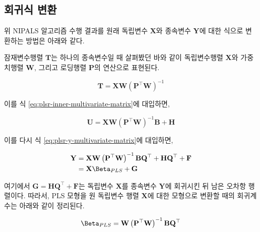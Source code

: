 \documentclass[]{book}
\newenvironment{Shaded}{\begin{snugshade}}{\end{snugshade}}
\newcommand{\KeywordTok}[1]{\textcolor[rgb]{0.13,0.29,0.53}{\textbf{#1}}}
\newcommand{\NormalTok}[1]{#1}
\newcommand{\OperatorTok}[1]{\textcolor[rgb]{0.81,0.36,0.00}{\textbf{#1}}}
\newcommand{\StringTok}[1]{\textcolor[rgb]{0.31,0.60,0.02}{#1}}
\begin{document}
\hypertarget{plsr-multivariate-transform}{%
\subsection{회귀식 변환}\label{plsr-multivariate-transform}}

위 NIPALS 알고리즘 수행 결과를 원래 독립변수 \(\mathbf{X}\)와 종속변수 \(\mathbf{Y}\)에 대한 식으로 변환하는 방법은 아래와 같다.

잠재변수행렬 \(\mathbf{T}\)는 하나의 종속변수일 때 살펴봤던 바와 같이 독립변수행렬 \(\mathbf{X}\)와 가중치행렬 \(\mathbf{W}\), 그리고 로딩행렬 \(\mathbf{P}\)의 연산으로 표현된다.

\begin{equation}
\mathbf{T} = \mathbf{X} \mathbf{W} \left(\mathbf{P}^\top \mathbf{W}\right)^{-1}
\end{equation}

이를 식 \eqref{eq:plsr-inner-multivariate-matrix}에 대입하면,

\begin{equation}
\mathbf{U} = \mathbf{X} \mathbf{W} \left(\mathbf{P}^\top \mathbf{W}\right)^{-1} \mathbf{B} + \mathbf{H}
\end{equation}

이를 다시 식 \eqref{eq:plsr-y-multivariate-matrix}에 대입하면,

\begin{equation}
\begin{split}
\mathbf{Y} &= \mathbf{X} \mathbf{W} \left(\mathbf{P}^\top \mathbf{W}\right)^{-1} \mathbf{B} \mathbf{Q}^\top + \mathbf{H} \mathbf{Q}^\top + \mathbf{F}\\
&= \mathbf{X} \boldsymbol{\Beta}_{PLS} + \mathbf{G}
\end{split} \label{eq:plsr-multivariate-beta}
\end{equation}

여기에서 \(\mathbf{G} = \mathbf{H} \mathbf{Q}^\top + \mathbf{F}\)는 독립변수 \(\mathbf{X}\)를 종속변수 \(\mathbf{Y}\)에 회귀시킨 뒤 남은 오차항 행렬이다. 따라서, PLS 모형을 원 독립변수 행렬 \(\mathbf{X}\)에 대한 모형으로 변환할 때의 회귀계수는 아래와 같이 정리된다.

\begin{equation}
\boldsymbol{\Beta}_{PLS} = \mathbf{W} \left(\mathbf{P}^\top \mathbf{W}\right)^{-1} \mathbf{B} \mathbf{Q}^\top
\end{equation}

\begin{Shaded}
\end{Shaded}
\end{document}
